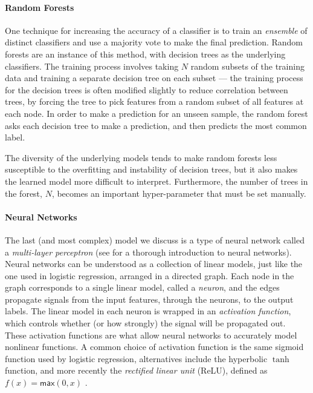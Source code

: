 \paragraph{Random Forests}
One technique for increasing the accuracy of a classifier is to train an
\emph{ensemble} of distinct classifiers and use a majority vote
to make the final prediction.
%
Random forests are an instance of this method, with decision
trees as the underlying classifiers.
%
The training process involves taking $N$ random subsets of the training
data and training a separate decision tree on each subset --- the
training process for the decision trees is often modified slightly to
reduce correlation between trees, by forcing the tree to pick features
from a random subset of all features at each node.
%
In order to make a prediction for an unseen sample, the random forest
asks each decision tree to make a prediction, and then predicts the most
common label.

The diversity of the underlying models tends to make random forests less
susceptible to the overfitting and instability of decision trees, but it
also makes the learned model more difficult to interpret.
%
Furthermore, the number of trees in the forest, $N$, becomes an important
hyper-parameter that must be set manually.


\paragraph{Neural Networks}
The last (and most complex) model we discuss is a type of neural network
called a \emph{multi-layer perceptron} (see \citealt{Nielsen2015-pu} for
a thorough introduction to neural networks).
%
Neural networks can be understood as a collection of linear models, just
like the one used in logistic regression, arranged in a directed graph.
%
Each node in the graph corresponds to a single linear model, called a
\emph{neuron}, and the edges propagate signals from the input features,
through the neurons, to the output labels.
%
The linear model in each neuron is wrapped in an \emph{activation
  function}, which controls whether (or how strongly) the signal will be
propagated out.
%
These activation functions are what allow neural networks to accurately
model nonlinear functions.
%
A common choice of activation function is the same sigmoid function used
by logistic regression, alternatives include the hyperbolic $\tanh$
function, and more recently the \emph{rectified linear unit} (ReLU),
defined as $f(x) = \mathsf{max}(0,x)$ \citep{Nair2010-xg}.

